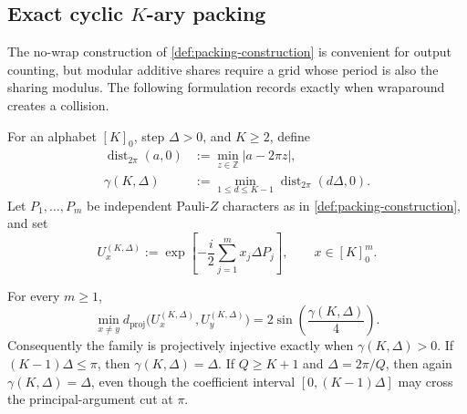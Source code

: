 \subsection{Exact cyclic $K$-ary packing}
\label{sec:w1-qary-packing}

The no-wrap construction of \cref{def:packing-construction} is convenient
for output counting, but modular additive shares require a grid whose period
is also the sharing modulus.  The following formulation records exactly when
wraparound creates a collision.

\begin{definition}
\label{def:w1-wrap-margin}
For an alphabet $[K]_0$, step $\Delta>0$, and $K\geq2$, define
\begin{align}
 \operatorname{dist}_{2\pi}(a,0)
 &:=\min_{z\in\mathbb Z}|a-2\pi z|,\\
 \gamma(K,\Delta)
 &:=\min_{1\leq d\leq K-1}
       \operatorname{dist}_{2\pi}(d\Delta,0).
\end{align}
Let $P_1,\ldots,P_m$ be independent Pauli-$Z$ characters as in
\cref{def:packing-construction}, and set
\begin{equation}
 U_x^{(K,\Delta)}:=
 \exp\!\left[-\frac{i}{2}\sum_{j=1}^m x_j\Delta P_j\right],
 \qquad x\in[K]_0^m.
\end{equation}
\end{definition}

\begin{theorem}
\label{thm:w1-exact-separation}
For every $m\geq1$,
\begin{equation}
 \min_{x\neq y}d_{\mathrm{proj}}
 \bigl(U_x^{(K,\Delta)},U_y^{(K,\Delta)}\bigr)
 =2\sin\!\left(\frac{\gamma(K,\Delta)}4\right).
 \label{eq:w1-exact-separation}
\end{equation}
Consequently the family is projectively injective exactly when
$\gamma(K,\Delta)>0$.  If $(K-1)\Delta\leq\pi$, then
$\gamma(K,\Delta)=\Delta$.  If $Q\geq K+1$ and
$\Delta=2\pi/Q$, then again $\gamma(K,\Delta)=\Delta$, even though the
coefficient interval $[0,(K-1)\Delta]$ may cross the principal-argument
cut at $\pi$.
\end{theorem}

